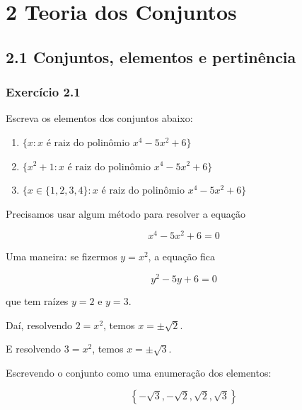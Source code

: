 \documentclass[
  letterpaper,
  DIV=11,
  numbers=noendperiod]{scrreprt}
\begin{document}

\chapter*{2 Teoria dos Conjuntos}\label{teoria-dos-conjuntos}


\section*{2.1 Conjuntos, elementos e
pertinência}\label{conjuntos-elementos-e-pertinuxeancia}


\subsection*{Exercício 2.1}\label{exr-2-1}

Escreva os elementos dos conjuntos abaixo:

\begin{enumerate}
\def\labelenumi{\alph{enumi})}
\item
  $\{ x : x \text{ é raiz do polinômio } x^4 - 5x^2 + 6 \}$
\item
  $\{ x^2 + 1 : x \text{ é raiz do polinômio } x^4 - 5x^2 + 6 \}$
\item
  $\{ x \in \{1, 2, 3, 4\} : x \text{ é raiz do polinômio } x^4 - 5x^2 + 6 \}$
\end{enumerate}

\begin{tcolorbox}[enhanced jigsaw, breakable, toptitle=1mm, opacitybacktitle=0.6, colback=white, toprule=.15mm, left=2mm, rightrule=.15mm, leftrule=.75mm, title={Resposta (a)}, coltitle=black, arc=.35mm, bottomtitle=1mm, opacityback=0, bottomrule=.15mm, colframe=quarto-callout-important-color-frame, titlerule=0mm, colbacktitle=quarto-callout-important-color!10!white]

Precisamos usar algum método para resolver a equação

\[
x^4 - 5x^2 + 6 = 0
\]

Uma maneira: se fizermos $y = x^2$, a equação fica

\[
y^2 - 5y + 6 = 0
\]

que tem raízes $y = 2$ e $y = 3$.

Daí, resolvendo $2 = x^2$, temos $x = \pm\sqrt2$.

E resolvendo $3 = x^2$, temos $x = \pm\sqrt3$.

Escrevendo o conjunto como uma enumeração dos elementos:

\[
\left\{ -\sqrt3, -\sqrt2, \sqrt2, \sqrt3 \right\}
\]

\end{tcolorbox}
\end{document}
